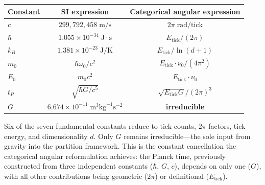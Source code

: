 \documentclass[twocolumn,10pt,a4paper]{article}
\theoremstyle{definition}
\theoremstyle{remark}
\begin{document}
\begin{center}
\begin{tabular}{lcc}
\toprule
\textbf{Constant} & \textbf{SI expression} & \textbf{Categorical angular expression} \\
\midrule
$c$ & $299{,}792{,}458\;\text{m/s}$ & $2\pi\;\text{rad/tick}$ \\
$\hbar$ & $1.055 \times 10^{-34}\;\text{J}\cdot\text{s}$ & $E_{\text{tick}} / (2\pi)$ \\
$k_B$ & $1.381 \times 10^{-23}\;\text{J/K}$ & $E_{\text{tick}} / \ln(d+1)$ \\
$m_0$ & $\hbar\omega_0/c^2$ & $E_{\text{tick}} \cdot \nu_0 / (4\pi^2)$ \\
$E_0$ & $m_0 c^2$ & $E_{\text{tick}} \cdot \nu_0$ \\
$t_P$ & $\sqrt{\hbar G/c^5}$ & $\sqrt{E_{\text{tick}} G} / (2\pi)^3$ \\
$G$ & $6.674 \times 10^{-11}\;\text{m}^3\text{kg}^{-1}\text{s}^{-2}$ & \textbf{irreducible} \\
\bottomrule
\end{tabular}
\end{center}

Six of the seven fundamental constants reduce to tick counts, $2\pi$ factors, tick energy, and dimensionality $d$. Only $G$ remains irreducible---the sole input from gravity into the partition framework. This is the constant cancellation the categorical angular reformulation achieves: the Planck time, previously constructed from three independent constants ($\hbar$, $G$, $c$), depends on only one ($G$), with all other contributions being geometric ($2\pi$) or definitional ($E_{\text{tick}}$).
\end{document}
